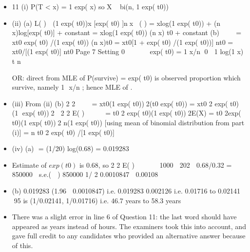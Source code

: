\documentclass[a4paper,12pt]{article}
\begin{document}
\begin{itemize}
\item 11 (i) P(T < x) = 1 	 exp(	
x) so X ~ bi(n, 1 	 exp(	
t0))
\item (ii) (a) L(
)  (1 	 exp(	
t0))x [exp(	
t0) ]nx
(
) = xlog(1 	 exp(	
t0)) + (n 	 x)log[exp(	
t0)] + constant
= xlog(1 	 exp(	
t0)) 	 (n 	 x)
t0 + constant
(b) 

 = xt0 exp(	
t0) /(1 	 exp(	
t0)) 	 (n 	 x)t0
= xt0[1 + exp(	
t0) /(1 	 exp(	
t0))] 	 nt0
= xt0/[(1 	 exp(	
t0)] 	 nt0
Page 7
Setting 0 


  exp(	
t0) = 1 	 x/n 
0
 1 log(1 x)
t n
   
\item [OR: direct from MLE of P(survive) = exp(	
t0) is observed
proportion which survive, namely 1  x/n ; hence MLE of 
.]
\item (iii) From (ii) (b)
2
2


 = 	xt0(1 	 exp(	
t0))2(t0 exp(	
t0))
= 	 xt0
2 exp(	
t0) (1 	exp(	
t0))2

2
2 E( ) 


 = t0
2 exp(	
t0)(1 	 exp(	
t0))2E(X)
= t0
2exp(	
t0)(1 	 exp(	
t0))2 n(1 	 exp(	
t0))
[using mean of binomial distribution from part (i)]
= n t0
2 exp(	
t0) /[1 	 exp(	
t0)]
\item (iv) (a)  = 	 (1/20) log(0.68) = 0.019283
\item Estimate of $exp(	
t0)$ is 0.68,
so
2
2 E( ) 


  1000  202  0.68/0.32 = 850000
 s.e.(  ) 850000 1/ 2 0.0010847  0.00108     
\item (b) 0.019283 
 (1.96  0.0010847)
i.e. 0.019283 
 0.002126 i.e. 0.01716 to 0.02141
95%
 is (1/0.02141, 1/0.01716)
i.e. 46.7 years to 58.3 years

\item There was a slight error in line 6 of Question 11: the last word should have appeared as
years instead of hours. The examiners took this into account, and gave full credit to
any candidates who provided an alternative answer because of this.
\end{itemize}
\end{document}
